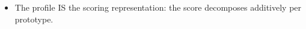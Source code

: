 \begin{itemize}
    \item The profile IS the scoring representation: the score decomposes additively per prototype. 

\end{itemize}

